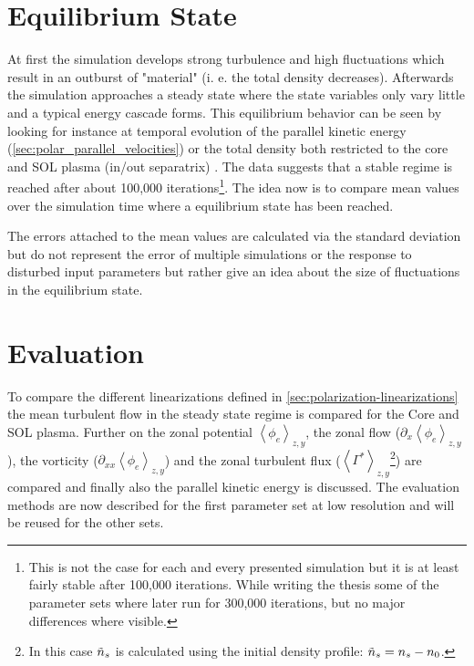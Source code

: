 \documentclass[master.tex]{subfiles}
\newcommand{\meanxy}[1]{\left<#1\right>_{z,y}}
\begin{document}
\section{Equilibrium State}
At first the simulation develops strong turbulence and high fluctuations which result in an outburst of "material" (i. e. the total density decreases). Afterwards the simulation approaches a steady state where the state variables only vary little and a typical energy cascade forms. This equilibrium behavior can be seen by looking for instance at temporal evolution of the parallel kinetic energy (\autoref{sec:polar_parallel_velocities}) or the total density both restricted to the core and \ac{SOL} plasma (in/out separatrix) . The data suggests that a stable regime is reached after about 100,000 iterations\footnote{This is not the case for each and every presented simulation but it is at least fairly stable after 100,000 iterations. While writing the thesis some of the parameter sets where later run for 300,000 iterations, but no major differences where visible.}. The idea now is to compare mean values over the simulation time where a equilibrium state has been reached. 



\begin{blockquote}
    The errors attached to the mean values are calculated via the standard deviation but do not represent the error of multiple simulations or the response to disturbed input parameters but rather give an idea about the size of fluctuations in the equilibrium state.
\end{blockquote}
    
\section{Evaluation}
To compare the different linearizations defined in \autoref{sec:polarization-linearizations} the mean turbulent flow in the steady state regime is compared for the Core and \ac{SOL} plasma. Further on the zonal potential  $\meanxy{\phi_e}$, the zonal flow ($\partial_x \meanxy{\phi_e}$), the vorticity ($\partial_{xx}\meanxy{\phi_e}$) and the zonal turbulent flux ($\left<\Gamma^*\right>_{z,y}$\footnote{In this case $\Tilde{n}_s$ is calculated using the initial density profile: $\Tilde{n}_s = n_s - n_0$.}) are compared and finally also the parallel kinetic energy is discussed. The evaluation methods are now described for the first parameter set at low resolution and will be reused for the other sets.
\end{document}
